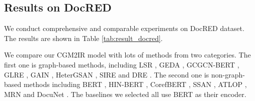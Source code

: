 \documentclass[11pt]{article}
\begin{document}
\subsection{Results on DocRED}

We conduct comprehensive and comparable experiments on DocRED dataset. 
The results are shown in Table \ref{tab:result_docred}.

We compare our CGM2IR model with lots of methods from two categories.
The first one is graph-based methods, including LSR \citep{nan-etal-2020-reasoning}, GEDA \citep{li-etal-2020-graph}, GCGCN-BERT \citep{zhou-etal-2020-global}, GLRE \citep{wang-etal-2020-global}, GAIN \citep{zeng-etal-2020-double}, HeterGSAN \citep{DBLP:conf/aaai/XuCZ21}, SIRE \citep{zeng-etal-2021-sire} and DRE \citep{xu-etal-2021-discriminative}.
The second one is non-graph-based methods including BERT \citep{DBLP:journals/corr/abs-1909-11898}, HIN-BERT \citep{DBLP:conf/pakdd/TangC0CFWY20}, CorefBERT \citep{ye-etal-2020-coreferential}, SSAN \citep{DBLP:conf/aaai/XuWLZM21}, ATLOP \citep{DBLP:conf/aaai/Zhou0M021}, MRN \citep{li-etal-2021-mrn} and DocuNet \citep{DBLP:conf/ijcai/ZhangCXDTCHSC21}. 
The baselines we selected all use BERT as their encoder.
\end{document}
